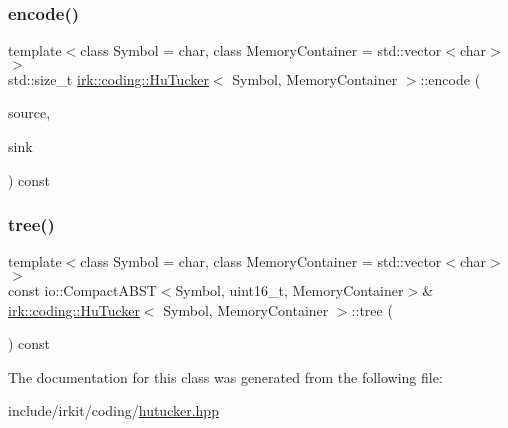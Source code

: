 \mbox{\label{classirk_1_1coding_1_1HuTucker_a68a281dc46a6038405fffeb8ea193a7e}} 
\subsubsection{\texorpdfstring{encode()}{encode()}\hspace{0.1cm}{\footnotesize\ttfamily [3/3]}}
{\footnotesize\ttfamily template$<$class Symbol  = char, class Memory\+Container  = std\+::vector$<$char$>$$>$ \\
std\+::size\+\_\+t \mbox{\hyperlink{classirk_1_1coding_1_1HuTucker}{irk\+::coding\+::\+Hu\+Tucker}}$<$ Symbol, Memory\+Container $>$\+::encode (\begin{DoxyParamCaption}\item[{std\+::istream \&}]{source,  }\item[{io\+::\+Output\+Bit\+Stream \&}]{sink }\end{DoxyParamCaption}) const\hspace{0.3cm}{\ttfamily [inline]}}

\mbox{\label{classirk_1_1coding_1_1HuTucker_a4def39a1f10a3c7b5a9d87574bfef552}} 
\subsubsection{\texorpdfstring{tree()}{tree()}}
{\footnotesize\ttfamily template$<$class Symbol  = char, class Memory\+Container  = std\+::vector$<$char$>$$>$ \\
const io\+::\+Compact\+A\+B\+ST$<$Symbol, uint16\+\_\+t, Memory\+Container$>$\& \mbox{\hyperlink{classirk_1_1coding_1_1HuTucker}{irk\+::coding\+::\+Hu\+Tucker}}$<$ Symbol, Memory\+Container $>$\+::tree (\begin{DoxyParamCaption}{ }\end{DoxyParamCaption}) const\hspace{0.3cm}{\ttfamily [inline]}}



The documentation for this class was generated from the following file\+:\begin{DoxyCompactItemize}
\item 
include/irkit/coding/\mbox{\hyperlink{hutucker_8hpp}{hutucker.\+hpp}}\end{DoxyCompactItemize}
